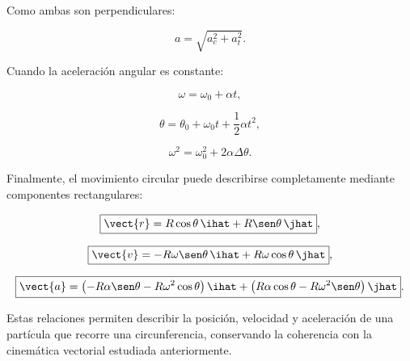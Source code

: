 \begin{resumen}
Como ambas son perpendiculares:

\[
\boxed{
a=\sqrt{a_c^2+a_t^2}
}.
\]

Cuando la aceleración angular es constante:

\[
\boxed{
\omega=\omega_0+\alpha t
},
\]

\[
\boxed{
\theta
=
\theta_0+\omega_0t+\frac12\alpha t^2
},
\]

\[
\boxed{
\omega^2
=
\omega_0^2+2\alpha\Delta\theta
}.
\]

Finalmente, el movimiento circular puede describirse completamente mediante
componentes rectangulares:

\[
\boxed{
\vect{r}
=
R\cos\theta\,\ihat
+
R\sen\theta\,\jhat
},
\]

\[
\boxed{
\vect{v}
=
-R\omega\sen\theta\,\ihat
+
R\omega\cos\theta\,\jhat
},
\]

\[
\boxed{
\vect{a}
=
\left(
-R\alpha\sen\theta-R\omega^2\cos\theta
\right)\ihat
+
\left(
R\alpha\cos\theta-R\omega^2\sen\theta
\right)\jhat
}.
\]

Estas relaciones permiten describir la posición, velocidad y aceleración de una
partícula que recorre una circunferencia, conservando la coherencia con la
cinemática vectorial estudiada anteriormente.

\end{resumen}